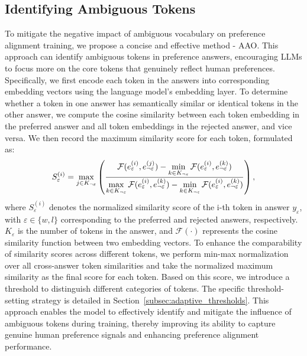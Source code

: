 \subsection{Identifying Ambiguous Tokens}
\label{subsec:identifying_focused_and_ambiguous_tokens}
To mitigate the negative impact of ambiguous vocabulary on preference alignment training, we propose a concise and effective method - AAO. This approach can identify ambiguous tokens in preference answers, encouraging LLMs to focus more on the core tokens that genuinely reflect human preferences. Specifically, we first encode each token in the answers into corresponding embedding vectors using the language model’s embedding layer. To determine whether a token in one answer has semantically similar or identical tokens in the other answer, we compute the cosine similarity between each token embedding in the preferred answer and all token embeddings in the rejected answer, and vice versa. We then record the maximum similarity score for each token, formulated as:
\begin{equation}
\footnotesize
S_\varepsilon^{(i)} = \max_{j \in K_{\neg \varepsilon}} \left( 
\frac{ \mathcal{F}(e_\varepsilon^{(i)}, e_{\neg \varepsilon}^{(j)}) - \min\limits_{k \in K_{\neg \varepsilon}} \mathcal{F}(e_\varepsilon^{(i)}, e_{\neg \varepsilon}^{(k)}) }
{ \max\limits_{k \in K_{\neg \varepsilon}} \mathcal{F}(e_\varepsilon^{(i)}, e_{\neg \varepsilon}^{(k)}) - \min\limits_{k \in K_{\neg \varepsilon}} \mathcal{F}(e_\varepsilon^{(i)}, e_{\neg \varepsilon}^{(k)}) } 
\right),
\label{eq:normalized_cosine_similarity}
\end{equation}
where $S_\varepsilon^{(i)}$ denotes the normalized similarity score of the i-th token in answer $y_\varepsilon$, with $\varepsilon \in \{w, l\}$ corresponding to the preferred and rejected answers, respectively. $K_\varepsilon$ is the number of tokens in the answer, and $\mathcal{F}(\cdot)$ represents the cosine similarity function between two embedding vectors. To enhance the comparability of similarity scores across different tokens, we perform min-max normalization over all cross-answer token similarities and take the normalized maximum similarity as the final score for each token. Based on this score, we introduce a threshold to distinguish different categories of tokens. The specific threshold-setting strategy is detailed in Section~\ref{subsec:adaptive_thresholds}. This approach enables the model to effectively identify and mitigate the influence of ambiguous tokens during training, thereby improving its ability to capture genuine human preference signals and enhancing preference alignment performance.

